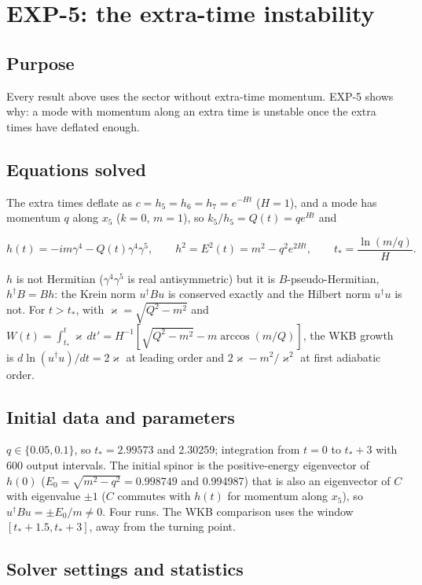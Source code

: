 \documentclass[11pt]{article}
\begin{document}
\section{EXP-5: the extra-time instability}

\subsection{Purpose}

Every result above uses the sector without extra-time momentum. EXP-5 shows why: a mode with momentum along an extra time is unstable once the extra times have deflated enough.

\subsection{Equations solved}

The extra times deflate as $c=h_5=h_6=h_7=e^{-Ht}$ ($H=1$), and a mode has momentum $q$ along $x_5$ ($k=0$, $m=1$), so $k_5/h_5=Q(t)=qe^{Ht}$ and

\[
h(t)=-im\gamma^4-Q(t)\gamma^4\gamma^5,\qquad h^2=E^2(t)=m^2-q^2e^{2Ht},\qquad t_\ast=\frac{\ln(m/q)}{H}.
\]

$h$ is not Hermitian ($\gamma^4\gamma^5$ is real antisymmetric) but it is $B$-pseudo-Hermitian, $h^\dagger B=Bh$: the Krein norm $u^\dagger Bu$ is conserved exactly and the Hilbert norm $u^\dagger u$ is not. For $t>t_\ast$, with $\varkappa=\sqrt{Q^2-m^2}$ and $W(t)=\int_{t_\ast}^t\varkappa\,dt'=H^{-1}[\sqrt{Q^2-m^2}-m\arccos(m/Q)]$, the WKB growth is $d\ln(u^\dagger u)/dt=2\varkappa$ at leading order and $2\varkappa-m^2/\varkappa^2$ at first adiabatic order.

\subsection{Initial data and parameters}

$q\in\{0.05,0.1\}$, so $t_\ast=2.99573$ and 2.30259; integration from $t=0$ to $t_\ast+3$ with 600 output intervals. The initial spinor is the positive-energy eigenvector of $h(0)$ ($E_0=\sqrt{m^2-q^2}=0.998749$ and 0.994987) that is also an eigenvector of $C$ with eigenvalue $\pm1$ ($C$ commutes with $h(t)$ for momentum along $x_5$), so $u^\dagger Bu=\pm E_0/m\ne0$. Four runs. The WKB comparison uses the window $[t_\ast+1.5,t_\ast+3]$, away from the turning point.

\subsection{Solver settings and statistics}
\end{document}
